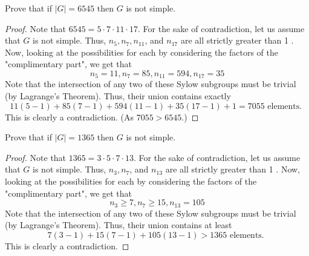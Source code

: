 \begin{exercise}
Prove that if $|G|=6545$ then $G$ is not simple.
\end{exercise}
\begin{proof}
Note that $6545=5 \cdot 7 \cdot 11 \cdot 17$. For the sake of contradiction, let us assume that $G$ is not simple. Thus, $n_5, n_7, n_{11}$, and $n_{17}$ are all strictly greater than 1 . Now, looking at the possibilities for each by considering the factors of the "complimentary part", we get that
\[
n_5=11, n_7=85, n_{11}=594, n_{17}=35
\]
Note that the intersection of any two of these Sylow subgroups must be trivial (by Lagrange's Theorem). Thus, their union contains exactly
\[
11(5-1)+85(7-1)+594(11-1)+35(17-1)+1=7055 \text { elements. }
\]
This is clearly a contradiction. (As $7055>6545$.)
\end{proof}

\begin{exercise}
Prove that if $|G|=1365$ then $G$ is not simple.
\end{exercise}
\begin{proof}
Note that $1365=3 \cdot 5 \cdot 7 \cdot 13$. For the sake of contradiction, let us assume that $G$ is not simple. Thus, $n_3, n_7$, and $n_{13}$ are all strictly greater than 1
.
Now, looking at the possibilities for each by considering the factors of the "complimentary part", we get that
\[
n_3 \geq 7, n_7 \geq 15, n_{13}=105
\]
Note that the intersection of any two of these Sylow subgroups must be trivial (by Lagrange's Theorem). Thus, their union contains at least
\[
7(3-1)+15(7-1)+105(13-1)>1365 \text { elements. }
\]
This is clearly a contradiction.
\end{proof}

